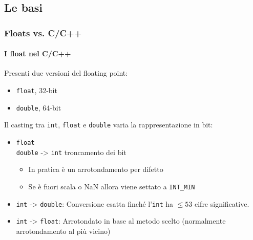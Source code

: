 \documentclass{beamer}
\begin{document}
  \subsection{Le basi}
  \begin{frame}
  	  \frametitle{Floats vs. C/C++}
    \framesubtitle{I float nel C/C++}
  	
    Presenti due versioni del floating point:
    \begin{itemize}
    		\item \texttt{float}, 32-bit
    		\item \texttt{double}, 64-bit
    \end{itemize}
        
    \vspace{1em}
    
    Il casting tra \texttt{int}, \texttt{float} e \texttt{double} varia la rappresentazione in bit:
    \begin{itemize}
    		\item \texttt{float}\\ \texttt{double} -> \texttt{int} troncamento dei bit
    		\begin{itemize}
    			\item In pratica è un arrotondamento per difetto
    			\item Se è fuori scala o NaN allora viene settato a \texttt{INT\_{}MIN}
    		\end{itemize}
    		\item \texttt{int} -> \texttt{double}: Conversione esatta finché l'\texttt{int} ha $\leq 53$ cifre significative.
    		\item \texttt{int} -> \texttt{float}: Arrotondato in base al metodo scelto (normalmente arrotondamento al più vicino)
    \end{itemize}
    
  \end{frame}
\end{document}
